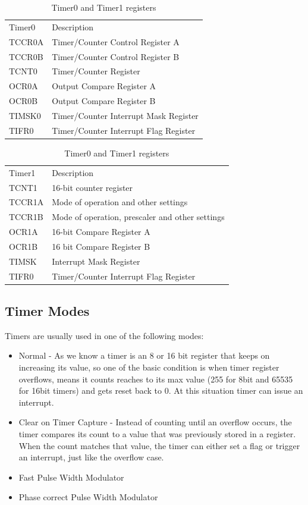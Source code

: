 \documentclass[english]{article}
\begin{document}
\begin{table}[H]
\caption{Timer0 and Timer1 registers}
\begin{tabular}{ l l |}
Timer0  &	Description\\
TCCR0A 	&	Timer/Counter Control Register A\\
TCCR0B  &	Timer/Counter Control Register B\\
TCNT0 	&	Timer/Counter Register\\
OCR0A 	&	Output Compare Register A\\
OCR0B 	&	Output Compare Register B\\
TIMSK0 	&	Timer/Counter Interrupt Mask Register\\
TIFR0   &	Timer/Counter Interrupt Flag Register\\
\end{tabular}
\begin{tabular}{ l l }
Timer1 &	Description\\
TCNT1 &	16-bit counter register\\
TCCR1A &	Mode of operation and other settings\\
TCCR1B & 	Mode of operation, prescaler and other settings\\
OCR1A 	& 16-bit Compare Register A\\
OCR1B &	16 bit Compare Register B\\
TIMSK & 	Interrupt Mask Register\\
TIFR0 &	Timer/Counter Interrupt Flag Register\\
\end{tabular}
\end{table}

\subsection{Timer Modes}
Timers are usually used in one of the following modes:
\begin{itemize}
\item Normal - As we know a timer is an 8 or 16 bit register that keeps on increasing its value, so one of the basic condition is when timer register overflows, means it counts reaches to its max value (255 for 8bit and 65535 for 16bit timers) and gets reset back to 0. At this situation timer can issue an interrupt.
\item Clear on Timer Capture - Instead of counting until an overflow occurs, the timer compares its count to a value that was previously stored in a register. When the count matches that value, the timer can either set a flag or trigger an interrupt, just like the overflow case. 
\item Fast Pulse Width Modulator
\item Phase correct Pulse Width Modulator
\end{itemize}
\end{document}
